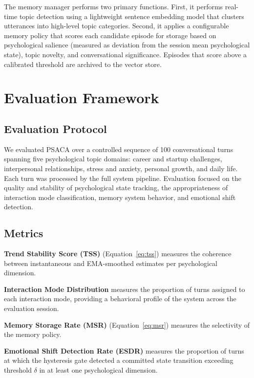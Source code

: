 \documentclass[conference]{IEEEtran}
\begin{document}
The memory manager performs two primary functions. First, it performs real-time topic detection using a lightweight sentence embedding model that clusters utterances into high-level topic categories. Second, it applies a configurable memory policy that scores each candidate episode for storage based on psychological salience (measured as deviation from the session mean psychological state), topic novelty, and conversational significance. Episodes that score above a calibrated threshold are archived to the vector store.

\section{Evaluation Framework}
\label{sec:evaluation}

\subsection{Evaluation Protocol}

We evaluated PSACA over a controlled sequence of 100 conversational turns spanning five psychological topic domains: career and startup challenges, interpersonal relationships, stress and anxiety, personal growth, and daily life. Each turn was processed by the full system pipeline. Evaluation focused on the quality and stability of psychological state tracking, the appropriateness of interaction mode classification, memory system behavior, and emotional shift detection.

\subsection{Metrics}

\textbf{Trend Stability Score (TSS)} (Equation~\eqref{eq:tss}) measures the coherence between instantaneous and EMA-smoothed estimates per psychological dimension.

\textbf{Interaction Mode Distribution} measures the proportion of turns assigned to each interaction mode, providing a behavioral profile of the system across the evaluation session.

\textbf{Memory Storage Rate (MSR)} (Equation~\eqref{eq:msr}) measures the selectivity of the memory policy.

\textbf{Emotional Shift Detection Rate (ESDR)} measures the proportion of turns at which the hysteresis gate detected a committed state transition exceeding threshold $\delta$ in at least one psychological dimension.
\end{document}
